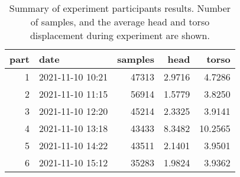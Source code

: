 \begin{table}
\centering
\caption{Summary of experiment participants results.  Number of samples, and the average head and torso displacement during experiment are shown.}
\label{table-subject-summary}
\begin{tabular}{rlrrr}
\toprule
part &             date & samples &   head &   torso \\
\midrule
   1 & 2021-11-10 10:21 &   47313 & 2.9716 &  4.7286 \\
   2 & 2021-11-10 11:15 &   56914 & 1.5779 &  3.8250 \\
   3 & 2021-11-10 12:20 &   45214 & 2.3325 &  3.9141 \\
   4 & 2021-11-10 13:18 &   43433 & 8.3482 & 10.2565 \\
   5 & 2021-11-10 14:22 &   43511 & 2.1401 &  3.9501 \\
   6 & 2021-11-10 15:12 &   35283 & 1.9824 &  3.9362 \\
\bottomrule
\end{tabular}
\end{table}
